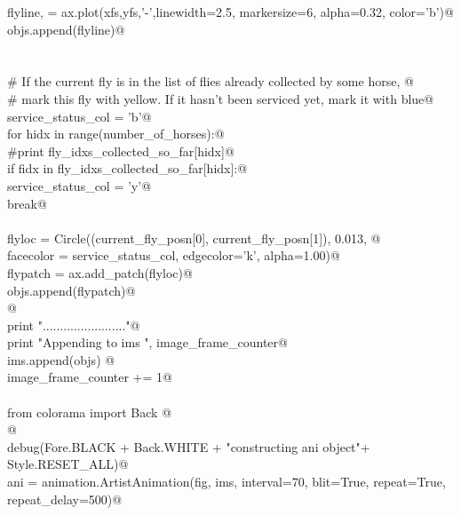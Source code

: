 \documentclass[12.0pt]{report}
\begin{document}
\begin{appendices}
\begin{flushleft}
\begin{list}{}{}
\mbox{}\verb@                flyline, = ax.plot(xfs,yfs,'-',linewidth=2.5, markersize=6, alpha=0.32, color='b')@\\
\mbox{}\verb@                objs.append(flyline)@\\
\mbox{}\verb@@\\
\mbox{}\verb@@\\
\mbox{}\verb@            # If the current fly is in the list of flies already collected by some horse, @\\
\mbox{}\verb@            # mark this fly with yellow. If it hasn't been serviced yet, mark it with blue@\\
\mbox{}\verb@            service_status_col = 'b'@\\
\mbox{}\verb@            for hidx in range(number_of_horses):@\\
\mbox{}\verb@                #print fly_idxs_collected_so_far[hidx]@\\
\mbox{}\verb@                if fidx in fly_idxs_collected_so_far[hidx]:@\\
\mbox{}\verb@                    service_status_col = 'y'@\\
\mbox{}\verb@                    break@\\
\mbox{}\verb@@\\
\mbox{}\verb@            flyloc   = Circle((current_fly_posn[0], current_fly_posn[1]), 0.013, @\\
\mbox{}\verb@                              facecolor = service_status_col, edgecolor='k', alpha=1.00)@\\
\mbox{}\verb@            flypatch = ax.add_patch(flyloc)@\\
\mbox{}\verb@            objs.append(flypatch)@\\
\mbox{}\verb@        @\\
\mbox{}\verb@        print "........................"@\\
\mbox{}\verb@        print "Appending to ims ", image_frame_counter@\\
\mbox{}\verb@        ims.append(objs) @\\
\mbox{}\verb@        image_frame_counter += 1@\\
\mbox{}\verb@@\\
\mbox{}\verb@    from colorama import Back @\\
\mbox{}\verb@   @\\
\mbox{}\verb@    debug(Fore.BLACK + Back.WHITE + "\nStarted constructing ani object"+ Style.RESET_ALL)@\\
\mbox{}\verb@    ani = animation.ArtistAnimation(fig, ims, interval=70, blit=True, repeat=True, repeat_delay=500)@\\

\end{list}
\end{flushleft}
\end{appendices}
\end{document}
